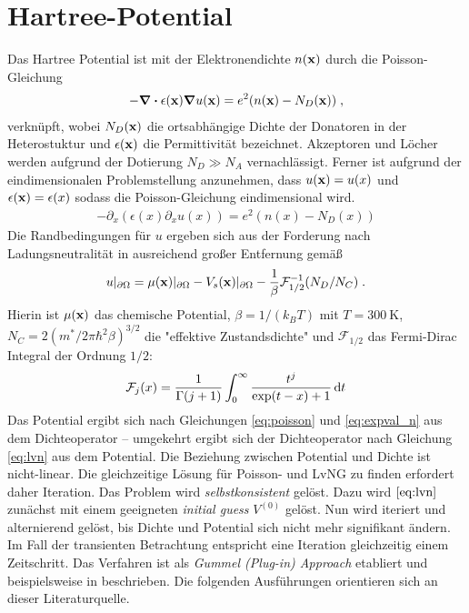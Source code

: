 \section{Hartree-Potential}\label{sec:A_4}
Das Hartree Potential ist mit der Elektronendichte $n(\vb{x})$ durch die Poisson-Gleichung \cite{frensley}
\begin{align}
  -\div \epsilon(\vb{x}) \grad u(\vb{x}) = e^2 (n(\vb{x}) - N_D(\vb{x})) \; ,
  \label{eq:poisson_3d}
\end{align}
verknüpft, wobei $N_D(\vb{x})$ die ortsabhängige Dichte der Donatoren in der Heterostuktur und $\epsilon(\vb{x})$ die Permittivität bezeichnet. Akzeptoren und Löcher werden aufgrund der Dotierung $N_D \gg N_A$ vernachlässigt. Ferner ist aufgrund der eindimensionalen Problemstellung anzunehmen, dass $u(\vb{x}) = u(x)$ und $\epsilon(\vb{x})=\epsilon(x)$ sodass die Poisson-Gleichung eindimensional wird.
\begin{align}
  -\partial_x (\epsilon(x)\partial_x u(x)) = e^2(n(x)-N_D(x))
  \label{eq:poisson}
\end{align}
Die Randbedingungen für $u$ ergeben sich aus der Forderung nach Ladungsneutralität in ausreichend großer Entfernung gemäß \cite{frensley}
\begin{align}
  u|_{\partial\Omega} = \mu(\vb{x})|_{\partial\Omega}-V_s(\vb{x})|_{\partial\Omega}-\frac{1}{\beta}\mathcal{F}_{1/2}^{-1}(N_D/N_C) \; .
  \label{eq:RB_PE}
\end{align}
Hierin ist $\mu(\vb{x})$ das chemische Potential, $\beta=1/(k_BT)$ mit $T=\SI{300}{\kelvin}$, $N_C = 2(m^*/2\pi\hbar^2\beta)^{3/2}$ die "effektive Zustandsdichte" und $\mathcal{F}_{1/2}$ das Fermi-Dirac Integral der Ordnung $1/2$:
\begin{align}
  \mathcal{F}_j(x)=\frac{1}{\Gamma(j+1)}\int_0^{\infty}\frac{t^j}{\exp(t-x)+1}\mathop{}\!\mathrm{d} t
\end{align}
Das Potential ergibt sich nach Gleichungen \eqref{eq:poisson} und \eqref{eq:expval_n} aus dem Dichteoperator -- umgekehrt ergibt sich der Dichteoperator nach Gleichung \eqref{eq:lvn} aus dem Potential. Die Beziehung zwischen Potential und Dichte ist nicht-linear. Die gleichzeitige Lösung für Poisson- und LvNG zu finden erfordert daher Iteration. Das Problem wird \emph{selbstkonsistent} gelöst. Dazu wird $\eqref{eq:lvn}$ zunächst mit einem geeigneten \emph{initial guess} $V^{(0)}$ gelöst. Nun wird iteriert und alternierend gelöst, bis Dichte und Potential sich nicht mehr signifikant ändern. Im Fall der transienten Betrachtung entspricht eine Iteration gleichzeitig einem Zeitschritt. Das Verfahren ist als \emph{Gummel (Plug-in) Approach} etabliert und beispielsweise in \cite{gummel} beschrieben. Die folgenden Ausführungen orientieren sich an dieser Literaturquelle.

